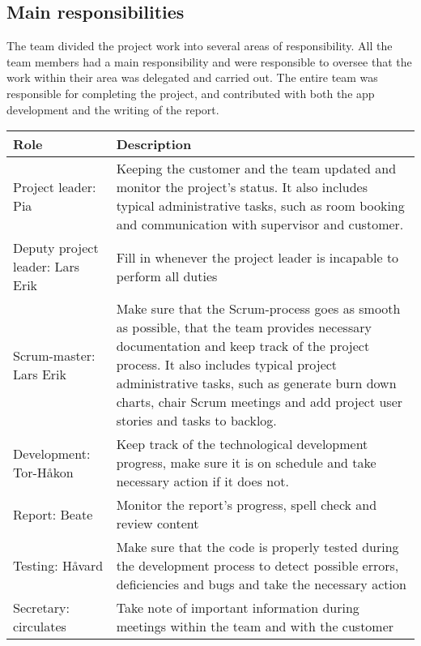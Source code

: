 \newpage
\subsection{Main responsibilities}

The team divided the project work into several areas of responsibility. All the team members had a main responsibility and were responsible to oversee that the work within their area was delegated and carried out. The entire team was responsible for completing the project, and contributed with both the app development and the writing of the report.


\begin{table}[H]
\centering
{}
\begin{tabular}{|l|p{9.7cm}|}
\hline
\textbf{Role} & \textbf{Description}\\\hline
Project leader: Pia & Keeping the customer and the team updated and monitor the project's status. It also includes typical administrative tasks, such as room booking and communication with supervisor and customer.\\\hline
Deputy project leader: Lars Erik & Fill in whenever the project leader is incapable to perform all duties\\\hline
Scrum-master: Lars Erik & Make sure that the Scrum-process goes as smooth as possible, that the team provides necessary documentation and keep track of the project process. It also includes typical project administrative tasks, such as generate burn down charts, chair Scrum meetings and add project user stories and tasks to backlog.\\\hline
Development: Tor-Håkon & Keep track of the technological development progress, make sure it is on schedule and take necessary action if it does not.\\\hline
Report: Beate & Monitor the report's progress, spell check and review content\\\hline
Testing: Håvard & Make sure that the code is properly tested during the development process to detect possible errors, deficiencies and bugs and take the necessary action \\\hline
Secretary: circulates & Take note of important information during meetings within the team and with the customer\\\hline
\end{tabular}
\end{table}
